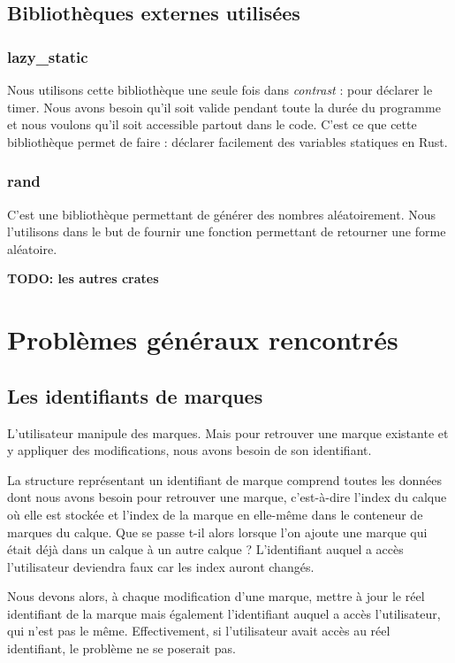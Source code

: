 \documentclass[12pt]{article}
\begin{document}
\subsection{Bibliothèques externes utilisées}
\subsubsection{lazy\_static}
Nous utilisons cette bibliothèque \cite{lazy-static} une seule fois dans
\textit{contrast} : pour déclarer le timer. Nous avons besoin qu'il soit valide pendant
toute la durée du programme et nous voulons qu'il soit accessible partout dans le code.
C'est ce que cette bibliothèque permet de faire : déclarer facilement des variables
statiques en Rust.

\subsubsection{rand}
C'est une bibliothèque \cite{rand} permettant de générer des nombres aléatoirement. Nous
l'utilisons dans le but de fournir une fonction permettant de retourner une forme
aléatoire.

\textbf{TODO: les autres crates}

\section{Problèmes généraux rencontrés}
\subsection{Les identifiants de marques}

L'utilisateur manipule des marques. Mais pour retrouver une marque existante et y
appliquer des modifications, nous avons besoin de son identifiant.

La structure représentant un identifiant de marque comprend toutes les données dont nous
avons besoin pour retrouver une marque, c'est-à-dire l'index du calque où elle est
stockée et l'index de la marque en elle-même dans le conteneur de marques du calque.
Que se passe t-il alors lorsque l'on ajoute une marque qui était déjà dans un calque à
un autre calque ? L'identifiant auquel a accès l'utilisateur deviendra faux car les index
auront changés.

Nous devons alors, à chaque modification d'une marque, mettre à jour le réel
identifiant de la marque mais également l'identifiant auquel a accès l'utilisateur, qui n'est pas le même.
Effectivement, si l'utilisateur avait accès au réel identifiant, le problème ne se
poserait pas.
\end{document}
